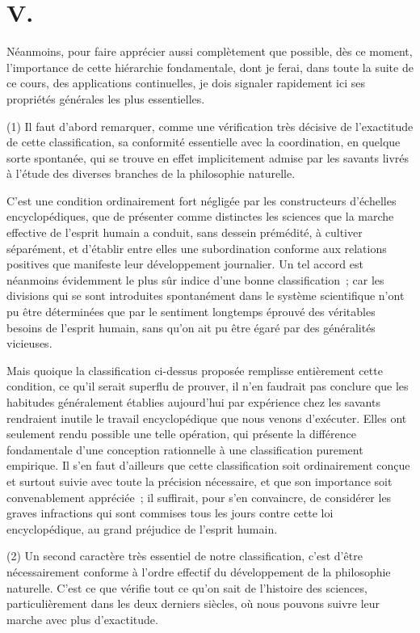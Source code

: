 \documentclass[french,twoside]{book} %
\begin{document}
\section[{V.}]{V.}
\noindent Néanmoins, pour faire apprécier aussi complètement que possible, dès ce moment, l’importance de cette hiérarchie fondamentale, dont je ferai, dans toute la suite de ce cours, des applications continuelles, je dois signaler rapidement ici ses propriétés générales les plus essentielles.\par
(1) Il faut d’abord remarquer, comme une vérification très décisive de l’exactitude de cette classification, sa conformité essentielle avec la coordination, en quelque sorte spontanée, qui se trouve en effet implicitement admise par les savants livrés à l’étude des diverses branches de la philosophie naturelle.\par
C’est une condition ordinairement fort négligée par les constructeurs d’échelles encyclopédiques, que de présenter comme distinctes les sciences que la marche effective de l’esprit humain a conduit, sans dessein prémédité, à cultiver séparément, et d’établir entre elles une subordination conforme aux relations positives que manifeste leur développement journalier. Un tel accord est néanmoins évidemment le plus sûr indice d’une bonne classification ; car les divisions qui se sont introduites spontanément dans le système scientifique n’ont pu être déterminées que par le sentiment longtemps éprouvé des véritables besoins de l’esprit humain, sans qu’on ait pu être égaré par des généralités vicieuses.\par
Mais quoique la classification ci-dessus proposée remplisse entièrement cette condition, ce qu’il serait superflu de prouver, il n’en faudrait pas conclure que les habitudes généralement établies aujourd’hui par expérience chez les savants rendraient inutile le travail encyclopédique que nous venons d’exécuter. Elles ont seulement rendu possible une telle opération, qui présente la différence fondamentale d’une conception rationnelle à une classification purement empirique. Il s’en faut d’ailleurs que cette classification soit ordinairement conçue et surtout suivie avec toute la précision nécessaire, et que son importance soit convenablement appréciée ; il suffirait, pour s’en convaincre, de considérer les graves infractions qui sont commises tous les jours contre cette loi encyclopédique, au grand préjudice de l’esprit humain.\par
(2) Un second caractère très essentiel de notre classification, c’est d’être nécessairement conforme à l’ordre effectif du développement de la philosophie naturelle. C’est ce que vérifie tout ce qu’on sait de l’histoire des sciences, particulièrement dans les deux derniers siècles, où nous pouvons suivre leur marche avec plus d’exactitude.\par
\end{document}

